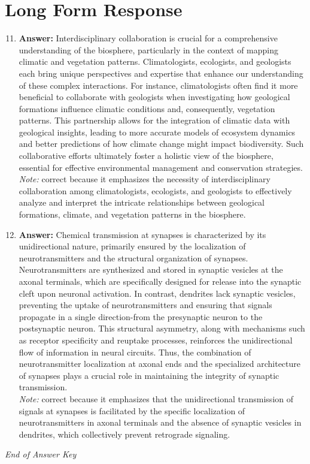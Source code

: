 \documentclass[12pt]{article}
\begin{document}
\section*{Long Form Response}
\begin{enumerate}[label=\arabic*.]
\setcounter{enumi}{10}
\item \textbf{Answer:} Interdisciplinary collaboration is crucial for a comprehensive understanding of the biosphere, particularly in the context of mapping climatic and vegetation patterns. Climatologists, ecologists, and geologists each bring unique perspectives and expertise that enhance our understanding of these complex interactions. For instance, climatologists often find it more beneficial to collaborate with geologists when investigating how geological formations influence climatic conditions and, consequently, vegetation patterns. This partnership allows for the integration of climatic data with geological insights, leading to more accurate models of ecosystem dynamics and better predictions of how climate change might impact biodiversity. Such collaborative efforts ultimately foster a holistic view of the biosphere, essential for effective environmental management and conservation strategies.
\\ \textit{Note:} correct because it emphasizes the necessity of interdisciplinary collaboration among climatologists, ecologists, and geologists to effectively analyze and interpret the intricate relationships between geological formations, climate, and vegetation patterns in the biosphere.
\item \textbf{Answer:} Chemical transmission at synapses is characterized by its unidirectional nature, primarily ensured by the localization of neurotransmitters and the structural organization of synapses. Neurotransmitters are synthesized and stored in synaptic vesicles at the axonal terminals, which are specifically designed for release into the synaptic cleft upon neuronal activation. In contrast, dendrites lack synaptic vesicles, preventing the uptake of neurotransmitters and ensuring that signals propagate in a single direction-from the presynaptic neuron to the postsynaptic neuron. This structural asymmetry, along with mechanisms such as receptor specificity and reuptake processes, reinforces the unidirectional flow of information in neural circuits. Thus, the combination of neurotransmitter localization at axonal ends and the specialized architecture of synapses plays a crucial role in maintaining the integrity of synaptic transmission.
\\ \textit{Note:} correct because it emphasizes that the unidirectional transmission of signals at synapses is facilitated by the specific localization of neurotransmitters in axonal terminals and the absence of synaptic vesicles in dendrites, which collectively prevent retrograde signaling.
\end{enumerate}

\vfill
\noindent\textit{End of Answer Key}
\end{document}
